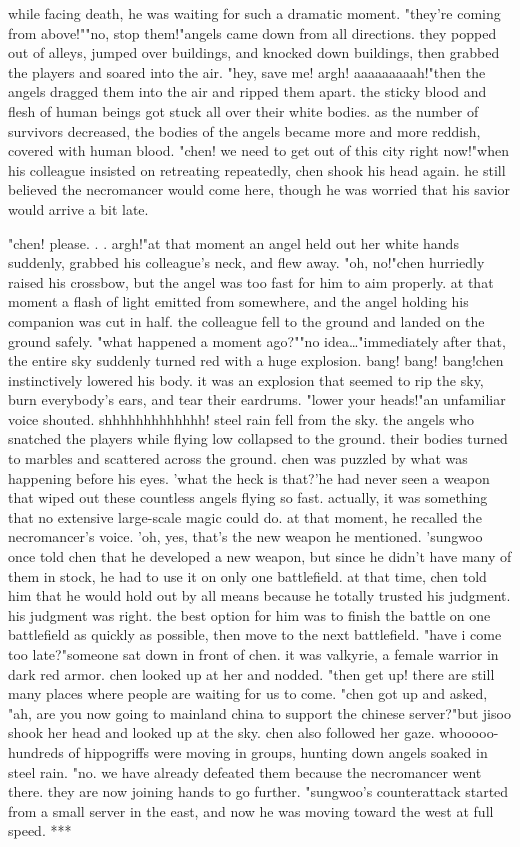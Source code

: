  while facing death, he was waiting for such a dramatic moment.
"they're coming from above!""no, stop them!"angels came down from all directions.
 they popped out of alleys, jumped over buildings, and knocked down buildings, then grabbed the players and soared into the air.
"hey, save me! argh! aaaaaaaaah!"then the angels dragged them into the air and ripped them apart.
 the sticky blood and flesh of human beings got stuck all over their white bodies.
 as the number of survivors decreased, the bodies of the angels became more and more reddish, covered with human blood.
 "chen! we need to get out of this city right now!"when his colleague insisted on retreating repeatedly, chen shook his head again.
he still believed the necromancer would come here, though he was worried that his savior would arrive a bit late.

"chen! please.
.
.
 argh!"at that moment an angel held out her white hands suddenly, grabbed his colleague's neck, and flew away.
"oh, no!"chen hurriedly raised his crossbow, but the angel was too fast for him to aim properly.
at that moment a flash of light emitted from somewhere, and the angel holding his companion was cut in half.
 the colleague fell to the ground and landed on the ground safely.
"what happened a moment ago?""no idea…"immediately after that, the entire sky suddenly turned red with a huge explosion.
bang! bang! bang!chen instinctively lowered his body.
 it was an explosion that seemed to rip the sky, burn everybody's ears, and tear their eardrums.
"lower your heads!"an unfamiliar voice shouted.
shhhhhhhhhhhhh! steel rain fell from the sky.
 the angels who snatched the players while flying low collapsed to the ground.
 their bodies turned to marbles and scattered across the ground.
chen was puzzled by what was happening before his eyes.
 'what the heck is that?'he had never seen a weapon that wiped out these countless angels flying so fast.
 actually, it was something that no extensive large-scale magic could do.
at that moment, he recalled the necromancer's voice.
'oh, yes, that's the new weapon he mentioned.
'sungwoo once told chen that he developed a new weapon, but since he didn't have many of them in stock, he had to use it on only one battlefield.
 at that time, chen told him that he would hold out by all means because he totally trusted his judgment.
his judgment was right.
 the best option for him was to finish the battle on one battlefield as quickly as possible, then move to the next battlefield.
"have i come too late?"someone sat down in front of chen.
 it was valkyrie, a female warrior in dark red armor.
chen looked up at her and nodded.
"then get up! there are still many places where people are waiting for us to come.
"chen got up and asked, "ah, are you now going to mainland china to support the chinese server?"but jisoo shook her head and looked up at the sky.
 chen also followed her gaze.
whooooo-hundreds of hippogriffs were moving in groups, hunting down angels soaked in steel rain.
"no.
 we have already defeated them because the necromancer went there.
 they are now joining hands to go further.
"sungwoo's counterattack started from a small server in the east, and now he was moving toward the west at full speed.
***

